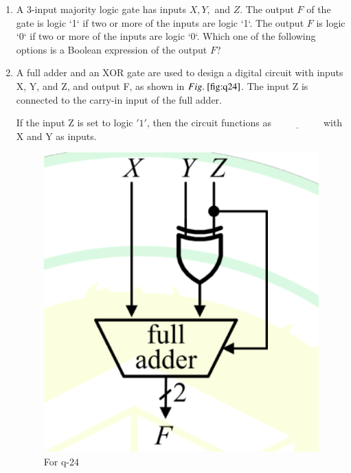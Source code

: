 \documentclass[journal,12pt,onecolumn]{IEEEtran}
\theoremstyle{remark}
\begin{document}
\begin{enumerate}
\hfill{}

\begin{enumerate}
\end{enumerate}

\item A 3-input majority logic gate has inputs $X, Y,$ and $Z$. 
    The output $F$ of the gate is logic `1` if two or more of the inputs are logic `1`. 
    The output $F$ is logic `0` if two or more of the inputs are logic `0`. 
    Which one of the following options is a Boolean expression of the output $F$?

\hfill{}

\begin{enumerate}
\end{enumerate}

\item A full adder and an XOR gate are used to design a digital circuit with inputs X, Y, and Z, and output F, as shown in $\figref{fig:q24}$. The input Z is connected to the carry-in input of the full adder.

If the input Z is set to logic $'1'$, then the circuit functions as $\underline{\hspace{2cm}}$ with X and Y as inputs.
\begin{figure}[H]
\centering
\includegraphics[width=0.4\columnwidth]{q24}
\caption{For q-24}
\label{fig:q24}
\end{figure}


\end{enumerate}
\end{document}
